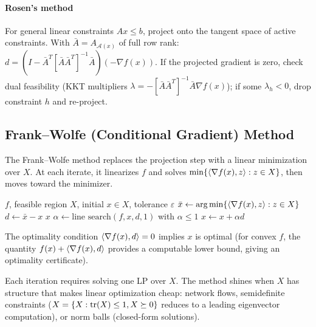 \paragraph{Rosen's method}

For general linear constraints $Ax \leq b$, project onto the tangent space of active constraints.
With $\bar{A} = A_{\mathcal{A}(x)}$ of full row rank:
$d = (I - \bar{A}^T[\bar{A}\bar{A}^T]^{-1}\bar{A})(-\nabla f(x))$.
If the projected gradient is zero, check dual feasibility (KKT multipliers $\lambda = -[\bar{A}\bar{A}^T]^{-1}\bar{A}\nabla f(x)$); if some $\lambda_h < 0$, drop constraint $h$ and re-project.


\subsection{Frank--Wolfe (Conditional Gradient) Method}\label{sec:frank-wolfe}

The Frank--Wolfe method replaces the projection step with a linear minimization over $X$.
At each iterate, it linearizes $f$ and solves $\min\{\langle\nabla f(x), z\rangle : z \in X\}$, then moves toward the minimizer.

\begin{algorithm}
	\caption{Frank--Wolfe Method (FW)}
	\label{alg:FW}
	\begin{algorithmic}[1]
		\Require $f$, feasible region $X$, initial $x \in X$, tolerance $\varepsilon$
				\State $\bar{x} \gets \operatorname*{arg\,min}\{\langle\nabla f(x), z\rangle : z \in X\}$ 
				\State $d \gets \bar{x} - x$
				 \Return $x$ \EndIf
				\State $\alpha \gets \text{line search}(f, x, d, 1)$ with $\alpha \leq 1$
				\State $x \gets x + \alpha d$
			\EndWhile
		\EndProcedure
	\end{algorithmic}
\end{algorithm}

The optimality condition $\langle\nabla f(x), d\rangle = 0$ implies $x$ is optimal (for convex $f$, the quantity $f(x) + \langle\nabla f(x), d\rangle$ provides a computable lower bound, giving an optimality certificate).

Each iteration requires solving one LP over $X$.
The method shines when $X$ has structure that makes linear optimization cheap: network flows, semidefinite constraints ($X = \{X : \operatorname{tr}(X) \leq 1, X \succeq 0\}$ reduces to a leading eigenvector computation), or norm balls (closed-form solutions).

